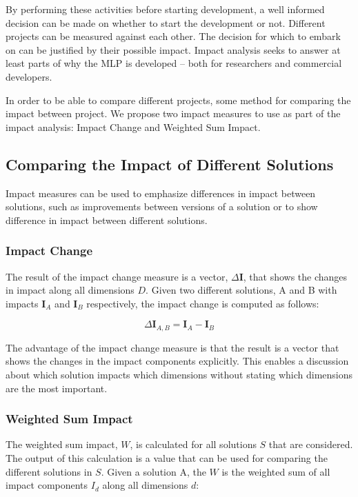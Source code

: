 \documentclass{article}
\theoremstyle{theorem}
\theoremstyle{definition}
\begin{document}
By performing these activities before starting development, a well informed decision can be made on whether to start the development or not.
Different projects can be measured against each other. 
The decision for which to embark on can be justified by their possible impact.
Impact analysis seeks to answer at least parts of why the MLP is developed -- both for researchers and commercial developers.

In order to be able to compare different projects, some method for comparing the impact between project.
We propose two impact measures to use as part of the impact analysis: Impact Change and Weighted Sum Impact.

\subsection{Comparing the Impact of Different Solutions}%
Impact measures can be used to emphasize differences in impact between solutions, such as improvements between versions of a solution or to show difference in impact between different solutions.

\subsubsection{Impact Change} 
The result of the impact change measure is a vector, $\Delta \textbf{I}$, that shows the changes in impact along all dimensions $D$.  
Given two different solutions, A and B with impacts $\textbf{I}_A$  and $\textbf{I}_B$ respectively, the impact change is computed as follows:

\begin{equation}
\Delta \textbf{I}_{A,B} = \textbf{I}_A - \textbf{I}_B
\end{equation} 

The advantage of the impact change measure is that the result is a vector that shows the changes in the impact components explicitly.
This enables a discussion about which solution impacts which dimensions without stating which dimensions are the most important.

\subsubsection{Weighted Sum Impact}
The weighted sum impact, $W$, is calculated for all solutions $S$ that are considered.
The output of this calculation is a value that can be used for comparing the different solutions in $S$.
Given a solution A, the $W$ is the weighted sum of all impact components $I_d$ along all dimensions $d$: %
\end{document}
